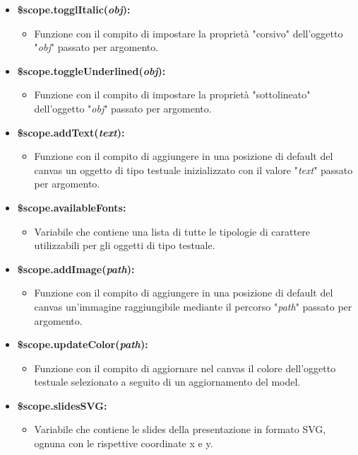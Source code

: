 \begin{itemize}
     \item \textbf{ \$scope.togglItalic(\textit{obj}): }
	\begin{itemize}
	      \item Funzione con il compito di impostare la proprietà "corsivo" dell'oggetto "\textit{obj}" passato per argomento.
	\end{itemize}
     \item \textbf{ \$scope.toggleUnderlined(\textit{obj}): }
	\begin{itemize}
	      \item Funzione con il compito di impostare la proprietà "sottolineato" dell'oggetto "\textit{obj}" passato per argomento.
	\end{itemize}
     \item \textbf{ \$scope.addText(\textit{text}): }
	\begin{itemize}
	      \item Funzione con il compito di aggiungere in una posizione di default del canvas un oggetto di tipo testuale inizializzato con il valore "\textit{text}" passato per argomento.
	\end{itemize}
      \item \textbf{ \$scope.availableFonts: }
	\begin{itemize}
	      \item Variabile che contiene una lista di tutte le tipologie di carattere utilizzabili per gli oggetti di tipo testuale.
	\end{itemize}
    \item \textbf{ \$scope.addImage(\textit{path}): }
	\begin{itemize}
	      \item Funzione con il compito di aggiungere in una posizione di default del canvas un'immagine raggiungibile mediante il percorso "\textit{path}" passato per argomento.
	\end{itemize}
    \item \textbf{ \$scope.updateColor(\textit{path}): }
	\begin{itemize}
	      \item Funzione con il compito di aggiornare nel canvas il colore dell'oggetto testuale selezionato a seguito di un aggiornamento del model.
	\end{itemize}
    \item \textbf{ \$scope.slidesSVG:}
	\begin{itemize}
	      \item Variabile che contiene le slides della presentazione in formato SVG, ognuna con le rispettive coordinate x e y.

\end{itemize}
\end{itemize}
